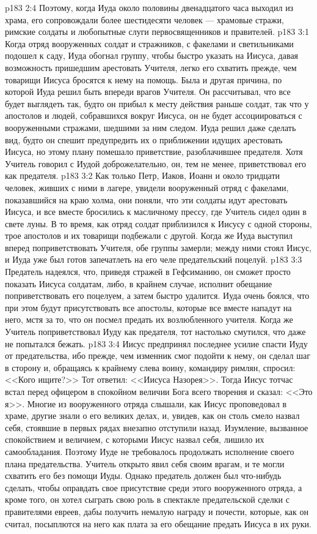 \vs p183 2:4 Поэтому, когда Иуда около половины двенадцатого часа выходил из храма, его сопровождали более шестидесяти человек --- храмовые стражи, римские солдаты и любопытные слуги первосвященников и правителей.
\vs p183 3:1 Когда отряд вооруженных солдат и стражников, с факелами и светильниками подошел к саду, Иуда обогнал группу, чтобы быстро указать на Иисуса, давая возможность пришедшим арестовать Учителя, легко его схватить прежде, чем товарищи Иисуса бросятся к нему на помощь. Была и другая причина, по которой Иуда решил быть впереди врагов Учителя. Он рассчитывал, что все будет выглядеть так, будто он прибыл к месту действия раньше солдат, так что у апостолов и людей, собравшихся вокруг Иисуса, он не будет ассоциироваться с вооруженными стражами, шедшими за ним следом. Иуда решил даже сделать вид, будто он спешит предупредить их о приближении идущих арестовать Иисуса, но этому плану помешало приветствие, разоблачившее предателя. Хотя Учитель говорил с Иудой доброжелательно, он, тем не менее, приветствовал его как предателя.
\vs p183 3:2 Как только Петр, Иаков, Иоанн и около тридцати человек, живших с ними в лагере, увидели вооруженный отряд с факелами, показавшийся на краю холма, они поняли, что эти солдаты идут арестовать Иисуса, и все вместе бросились к масличному прессу, где Учитель сидел один в свете луны. В то время, как отряд солдат приблизился к Иисусу с одной стороны, трое апостолов и их товарищи подбежали с другой. Когда же Иуда выступил вперед поприветствовать Учителя, обе группы замерли; между ними стоял Иисус, и Иуда уже был готов запечатлеть на его челе предательский поцелуй.
\vs p183 3:3 Предатель надеялся, что, приведя стражей в Гефсиманию, он сможет просто показать Иисуса солдатам, либо, в крайнем случае, исполнит обещание поприветствовать его поцелуем, а затем быстро удалится. Иуда очень боялся, что при этом будут присутствовать все апостолы, которые все вместе нападут на него, мстя за то, что он посмел предать их возлюбленного учителя. Когда же Учитель поприветствовал Иуду как предателя, тот настолько смутился, что даже не попытался бежать.
\vs p183 3:4 Иисус предпринял последнее усилие спасти Иуду от предательства, ибо прежде, чем изменник смог подойти к нему, он сделал шаг в сторону и, обращаясь к крайнему слева воину, командиру римлян, спросил: <<Кого ищите?>> Тот ответил: <<Иисуса Назорея>>. Тогда Иисус тотчас встал перед офицером в спокойном величии Бога всего творения и сказал: <<Это я>>. Многие из вооруженного отряда слышали, как Иисус проповедовал в храме, другие знали о его великих делах, и, увидев, как он столь смело назвал себя, стоявшие в первых рядах внезапно отступили назад. Изумление, вызванное спокойствием и величием, с которыми Иисус назвал себя, лишило их самообладания. Поэтому Иуде не требовалось продолжать исполнение своего плана предательства. Учитель открыто явил себя своим врагам, и те могли схватить его без помощи Иуды. Однако предатель должен был что\hyp{}нибудь сделать, чтобы оправдать свое присутствие среди этого вооруженного отряда, а кроме того, он хотел сыграть свою роль в спектакле предательской сделки с правителями евреев, дабы получить немалую награду и почести, которые, как он считал, посыплются на него как плата за его обещание предать Иисуса в их руки.
